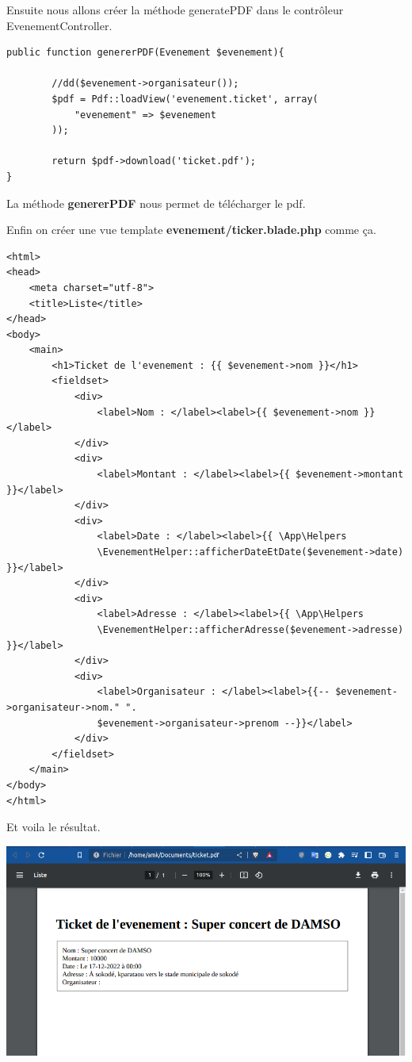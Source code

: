 \documentclass[12pt,a4paper]{article}
\begin{document}
Ensuite nous allons créer la méthode generatePDF dans le contrôleur EvenementController.
\begin{verbatim}
public function genererPDF(Evenement $evenement){

        //dd($evenement->organisateur());
        $pdf = Pdf::loadView('evenement.ticket', array(
            "evenement" => $evenement
        ));

        return $pdf->download('ticket.pdf');
}
\end{verbatim}
La méthode \textbf{genererPDF} nous permet de télécharger le pdf.

Enfin on créer une vue template \textbf{evenement/ticker.blade.php} comme ça.
\begin{verbatim}
<html>
<head>
    <meta charset="utf-8">
    <title>Liste</title>
</head>
<body>
    <main>
        <h1>Ticket de l'evenement : {{ $evenement->nom }}</h1>
        <fieldset>
            <div>
                <label>Nom : </label><label>{{ $evenement->nom }}</label>
            </div>
            <div>
                <label>Montant : </label><label>{{ $evenement->montant }}</label>
            </div>
            <div>
                <label>Date : </label><label>{{ \App\Helpers
                \EvenementHelper::afficherDateEtDate($evenement->date) }}</label>
            </div>
            <div>
                <label>Adresse : </label><label>{{ \App\Helpers
                \EvenementHelper::afficherAdresse($evenement->adresse) }}</label>
            </div>
            <div>
                <label>Organisateur : </label><label>{{-- $evenement->organisateur->nom." ".
                $evenement->organisateur->prenom --}}</label>
            </div>
        </fieldset>
    </main>
</body>
</html>
\end{verbatim}

Et voila le résultat.\\
\begin{center}
\includegraphics[scale=0.5]{img/pdf.png}
\end{center}
\end{document}
